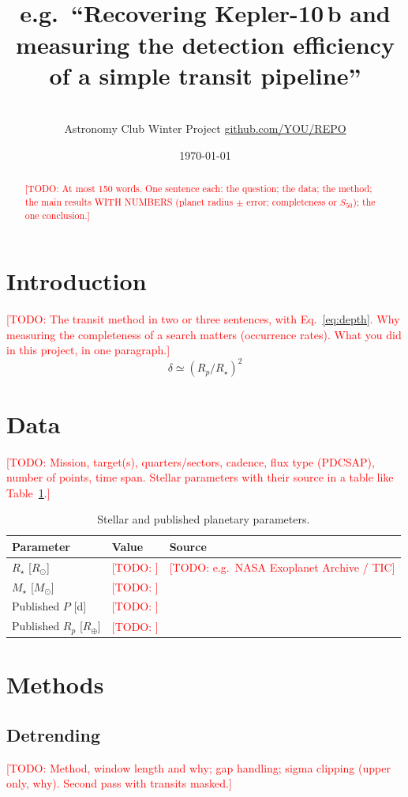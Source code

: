 \documentclass[11pt,a4paper]{article}
\title{\todo{A title that states your result}\\[2pt]
       \large e.g.\ ``Recovering Kepler-10\,b and measuring the detection efficiency of a simple transit pipeline''}
\author{\todo{Your Name}\\ \small Astronomy Club Winter Project \quad
        \href{https://github.com/YOU/REPO}{github.com/YOU/REPO}}
\date{\today}
\newcommand{\Rearth}{\ensuremath{R_\oplus}}
\newcommand{\todo}[1]{\textcolor{red}{[TODO: #1]}}
\begin{document}
\maketitle

\begin{abstract}
\todo{At most 150 words. One sentence each: the question; the data; the method; the main
results WITH NUMBERS (planet radius $\pm$ error; completeness or $S_{50}$); the one conclusion.}
\end{abstract}

\section{Introduction}
\todo{The transit method in two or three sentences, with Eq.~\eqref{eq:depth}. Why measuring the
completeness of a search matters (occurrence rates). What you did in this project, in one paragraph.}
\begin{equation}
  \delta \simeq \left(R_p/R_\star\right)^2 \label{eq:depth}
\end{equation}

\section{Data}
\todo{Mission, target(s), quarters/sectors, cadence, flux type (PDCSAP), number of points,
time span. Stellar parameters with their source in a table like Table~\ref{tab:star}.}
\begin{table}[h]
\centering
\caption{Stellar and published planetary parameters.}
\label{tab:star}
\begin{tabular}{@{}lll@{}}
\toprule
Parameter & Value & Source\\
\midrule
$R_\star$ [$R_\odot$] & \todo{} & \todo{e.g.\ NASA Exoplanet Archive / TIC}\\
$M_\star$ [$M_\odot$] & \todo{} & \\
Published $P$ [d] & \todo{} & \\
Published $R_p$ [\Rearth] & \todo{} & \\
\bottomrule
\end{tabular}
\end{table}

\section{Methods}
\subsection{Detrending}
\todo{Method, window length and why; gap handling; sigma clipping (upper only, why).
Second pass with transits masked.}
\end{document}
